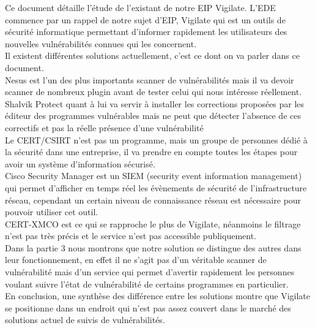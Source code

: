 Ce document détaille l'étude de l'existant de notre EIP Vigilate. L'EDE commence par un rappel de notre sujet d'EIP, Vigilate qui est un outils de sécurité informatique permettant d'informer rapidement les utilisateurs des nouvelles vulnérabilités connues qui les concernent.\\
Il existent différentes solutions actuellement, c’est ce dont on va parler dans ce document.\\
Nesus est l’un des plus importants scanner de vulnérabilités mais il va devoir scanner de nombreux plugin avant de tester celui qui nous intéresse réellement.\\
Shalvik Protect quant à lui va servir à installer les corrections proposées par les éditeur des programmes vulnérables mais ne peut que détecter l’absence de ces correctifs et pas la réelle présence d’une vulnérabilité\\
Le CERT/CSIRT n’est pas un programme, mais un groupe de personnes dédié à la sécurité dans une entreprise, il va prendre en compte toutes les étapes pour avoir un système d’information sécurisé.\\
Cisco Security Manager est un SIEM (security event information management) qui permet d’afficher en temps réel les évènements de sécurité de l'infrastructure réseau, cependant un certain niveau de connaissance réseau est nécessaire pour pouvoir utiliser cet outil.\\
CERT-XMCO est ce qui se rapproche le plus de Vigilate, néanmoins le filtrage n’est pas très précis et le service n’est pas accessible publiquement.\\
Dans la partie 3 nous montrons que notre solution se distingue des autres dans leur fonctionnement, en effet il ne s’agit pas d’un véritable scanner de vulnérabilité mais d’un service qui permet d’avertir rapidement les personnes voulant suivre l’état de vulnérabilité de certains programmes en particulier.\\
En conclusion, une synthèse des différence entre les solutions montre que Vigilate se positionne dans un endroit qui n’est pas assez couvert dans le marché des solutions actuel de suivis de vulnérabilités.\\